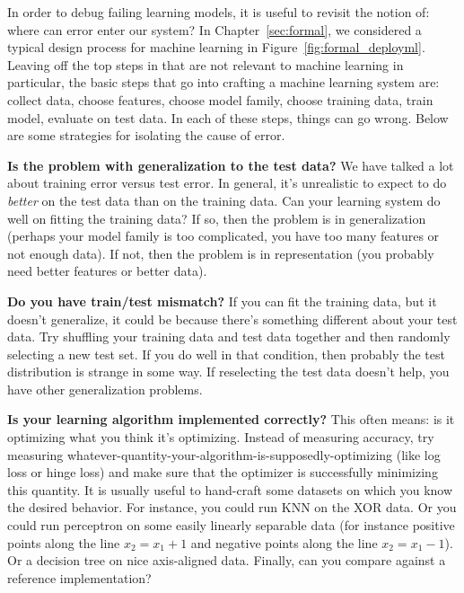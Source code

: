 In order to debug failing learning models, it is useful to revisit the notion of: where can error enter our system?
In Chapter~\ref{sec:formal}, we considered a typical design process for machine learning in Figure~\ref{fig:formal_deployml}.
Leaving off the top steps in that are not relevant to machine learning in particular, the basic steps that go into crafting a machine learning system are:
collect data, choose features, choose model family, choose training data, train model, evaluate on test data.
In each of these steps, things can go wrong.
Below are some strategies for isolating the cause of error.

\textbf{Is the problem with generalization to the test data?} We have talked a lot about training error versus test error. In general, it's unrealistic to expect to do \emph{better} on the test data than on the training data.
Can your learning system do well on fitting the training data? If so, then the problem is in generalization (perhaps your model family is too complicated, you have too many features or not enough data). If not, then the problem is in representation (you probably need better features or better data).

\textbf{Do you have train/test mismatch?} If you can fit the training data, but it doesn't generalize, it could be because there's something different about your test data. Try shuffling your training data and test data together and then randomly selecting a new test set. If you do well in that condition, then probably the test distribution is strange in some way. If reselecting the test data doesn't help, you have other generalization problems.

\textbf{Is your learning algorithm implemented correctly?} This often means: is it optimizing what you think it's optimizing. Instead of measuring accuracy, try measuring whatever-quantity-your-algorithm-is-supposedly-optimizing (like log loss or hinge loss) and make sure that the optimizer is successfully minimizing this quantity. It is usually useful to hand-craft some datasets on which you know the desired behavior.
For instance, you could run KNN on the XOR data.  Or you
could run perceptron on some easily linearly separable data (for
instance positive points along the line $x_2 = x_1 + 1$ and negative
points along the line $x_2 = x_1 - 1$).  Or a decision tree on nice
axis-aligned data.
Finally, can you compare against a reference implementation?

